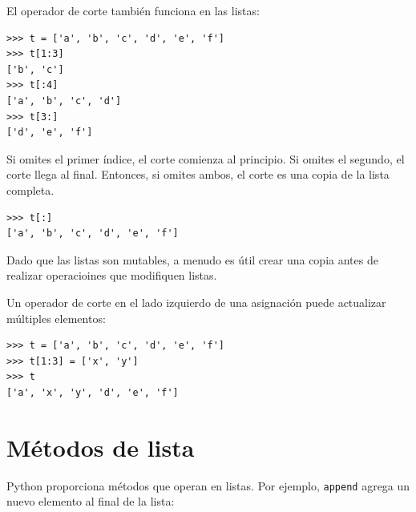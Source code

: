 \documentclass[10pt]{book}
\begin{document}
El operador de corte también funciona en las listas:

\begin{verbatim}
>>> t = ['a', 'b', 'c', 'd', 'e', 'f']
>>> t[1:3]
['b', 'c']
>>> t[:4]
['a', 'b', 'c', 'd']
>>> t[3:]
['d', 'e', 'f']
\end{verbatim}
%
Si omites el primer índice, el corte comienza al principio.
Si omites el segundo, el corte llega al final.  Entonces, si
omites ambos, el corte es una copia de la lista completa.

\begin{verbatim}
>>> t[:]
['a', 'b', 'c', 'd', 'e', 'f']
\end{verbatim}
%
Dado que las listas son mutables, a menudo es útil crear una copia
antes de realizar operacioines que modifiquen listas.

Un operador de corte en el lado izquierdo de una asignación
puede actualizar múltiples elementos:

\begin{verbatim}
>>> t = ['a', 'b', 'c', 'd', 'e', 'f']
>>> t[1:3] = ['x', 'y']
>>> t
['a', 'x', 'y', 'd', 'e', 'f']
\end{verbatim}
%


%

%


\section{Métodos de lista}

Python proporciona métodos que operan en listas.  Por ejemplo,
{\tt append} agrega un nuevo elemento al final de la lista:
\end{document}
